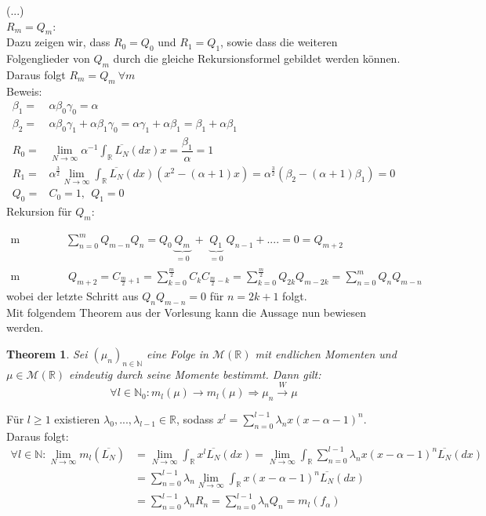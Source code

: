 \documentclass[a4paper, 11pt]{scrreprt}
\newtheorem{theorem}[defi]{Theorem}
\newcommand{\RR}{\mathbb{R}}
\newcommand{\NN}{\mathbb{N}}
\begin{document}
(...)\\






{$ R_m=Q_m $:}\\
Dazu zeigen wir, dass $ R_0=Q_0 $ und $ R_1=Q_1 $, sowie dass die weiteren Folgenglieder von $ Q_m $ durch die gleiche Rekursionsformel gebildet werden können. Daraus folgt $ R_m=Q_m ~ \forall m$ \\

Beweis: \begin{align*}
\beta_1=& \alpha \beta_0 \gamma_0 = \alpha \\
\beta_2=& \alpha \beta_0 \gamma_1 + \alpha \beta_1 \gamma_0 = \alpha \gamma_1 + \alpha \beta_1 = \beta_1 + \alpha \beta_1  \\
R_0 =& \lim_{N \to \infty} \alpha^{-1} \int_{\RR}\overline{L_{N}}(dx)x = \dfrac{\beta_1}{\alpha}=1 \\
R_1 =& \alpha^{\frac{3}{2}} \lim_{N \to \infty}\int_{\RR}\overline{L_{N}}(dx)(x^2 - (\alpha +1)x)= \alpha^{\frac{3}{2}} (\beta_2 - (\alpha+1)\beta_1)=0 \\
Q_0=& C_0 =1, ~~Q_1=0
\end{align*}
Rekursion für $ Q_m: $

\begin{align*}
\text{m ungerade:}& \sum_{n=0}^m Q_{m-n}Q_n= Q_0 \underbrace{Q_m}_{\substack{=0}} + \underbrace{Q_1}_{\substack{=0}}Q_{n-1}+....= 0=Q_{m+2}\\
\text {m gerade:}&~ Q_{m+2}= C_{\frac{m}{2}+1}= \sum_{k=0}^{\frac{m}{2}} C_k C_{\frac{m}{2}-k}=\sum_{k=0}^{\frac{m}{2}} Q_{2k}Q_{m-2k}=\sum_{n=0}^{m}Q_n Q_{m-n}
\end{align*}
wobei der letzte Schritt aus $ Q_n Q_{m-n}=0 $ für $ n=2k+1 $ folgt.\\

Mit folgendem Theorem aus der Vorlesung kann die Aussage nun bewiesen werden.

\begin{theorem}
Sei \((\mu_n)_{n \in \NN}\) eine Folge in $\mathcal{M}(\RR)$ mit endlichen Momenten und $\mu \in \mathcal{M}(\RR)$ eindeutig durch seine Momente bestimmt. Dann gilt:
\[\forall l \in \NN_0: m_l(\mu) \rightarrow m_l(\mu) \Rightarrow \mu_n \overset{W}{\rightarrow} \mu\]
\end{theorem}

Für $l \geq 1$ existieren $\lambda_0,...,\lambda_{l-1} \in \RR$, sodass $x^l = \sum_{n=0}^{l-1} \lambda_n x (x-\alpha-1)^n$. Daraus folgt:
\begin{align*}
\forall l \in \NN: \lim_{N \to \infty} m_l(\overline{L_{N}}) 
&= \lim_{N \to \infty} \int_\RR x^l \overline{L_{N}}(dx)
= \lim_{N \to \infty} \int_\RR \sum_{n=0}^{l-1} \lambda_n x (x-\alpha-1)^n \overline{L_{N}}(dx) \\
&= \sum_{n=0}^{l-1} \lambda_n \lim_{N \to \infty} \int_\RR x (x-\alpha-1)^n \overline{L_{N}}(dx) \\
&= \sum_{n=0}^{l-1} \lambda_n R_n
= \sum_{n=0}^{l-1} \lambda_n Q_n = m_l(f_\alpha)
\end{align*}
\end{document}
